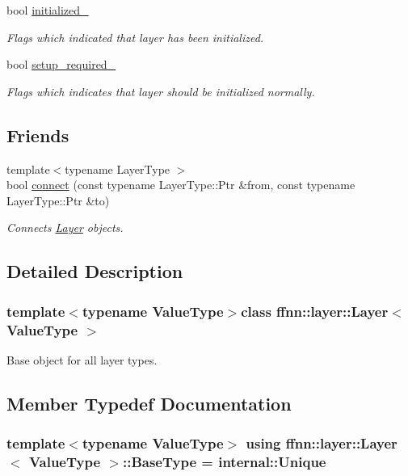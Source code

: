 \begin{DoxyCompactItemize}
bool \hyperlink{classffnn_1_1layer_1_1_layer_a4e353c2498ffed566076b3a7fd187e7b}{initialized\-\_\-}
\begin{DoxyCompactList}\small\item\em Flags which indicated that layer has been initialized. \end{DoxyCompactList}\item 
bool \hyperlink{classffnn_1_1layer_1_1_layer_a1a366d73e2b1ead280a6956c85ea56cb}{setup\-\_\-required\-\_\-}
\begin{DoxyCompactList}\small\item\em Flags which indicates that layer should be initialized normally. \end{DoxyCompactList}\end{DoxyCompactItemize}
\subsection*{Friends}
\begin{DoxyCompactItemize}
\item 
{\footnotesize template$<$typename Layer\-Type $>$ }\\bool \hyperlink{classffnn_1_1layer_1_1_layer_afbf91ff52dc8c3e894968dcc27cdecd5}{connect} (const typename Layer\-Type\-::\-Ptr \&from, const typename Layer\-Type\-::\-Ptr \&to)
\begin{DoxyCompactList}\small\item\em Connects \hyperlink{classffnn_1_1layer_1_1_layer}{Layer} objects. \end{DoxyCompactList}\end{DoxyCompactItemize}


\subsection{Detailed Description}
\subsubsection*{template$<$typename Value\-Type$>$class ffnn\-::layer\-::\-Layer$<$ Value\-Type $>$}

Base object for all layer types. 

\subsection{Member Typedef Documentation}
\hypertarget{classffnn_1_1layer_1_1_layer_a8946a9a8641a2760394238ce836b7df4}{
\subsubsection[{Base\-Type}]{\setlength{\rightskip}{0pt plus 5cm}template$<$typename Value\-Type$>$ using {\bf ffnn\-::layer\-::\-Layer}$<$ Value\-Type $>$\-::{\bf Base\-Type} =  {\bf internal\-::\-Unique}}}\label{classffnn_1_1layer_1_1_layer_a8946a9a8641a2760394238ce836b7df4}


